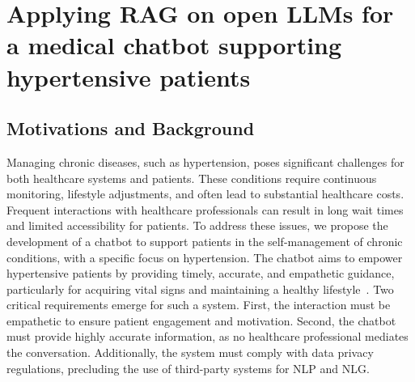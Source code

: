 

\section[RAG on open LLM dor medical chatbot]{Applying \gls{RAG} on open \glspl{LLM} for a medical chatbot supporting hypertensive patients}\label{sec:applying-rag-on-open-llm-for-a-medical-chatbot-supporting-hypertensive-patients}

\subsection{Motivations and Background}
\label{subsec:motivations-and-background-rag}
%
Managing chronic diseases, such as hypertension, poses significant challenges for both healthcare systems and patients.
%
These conditions require continuous monitoring, lifestyle adjustments, and often lead to substantial healthcare costs.
%
Frequent interactions with healthcare professionals can result in long wait times and limited accessibility for patients.
%
To address these issues, we propose the development of a chatbot to support patients in the self-management of chronic conditions, with a specific focus on hypertension.
%
The chatbot aims to empower hypertensive patients by providing timely, accurate, and empathetic guidance, particularly for acquiring vital signs and maintaining a healthy lifestyle~\cite{PLACEHOLDER1, PLACEHOLDER2}.
%
Two critical requirements emerge for such a system.
%
First, the interaction must be empathetic to ensure patient engagement and motivation.
%
Second, the chatbot must provide highly accurate information, as no healthcare professional mediates the conversation.
%
Additionally, the system must comply with data privacy regulations, precluding the use of third-party systems for \gls{NLP} and \gls{NLG}.

